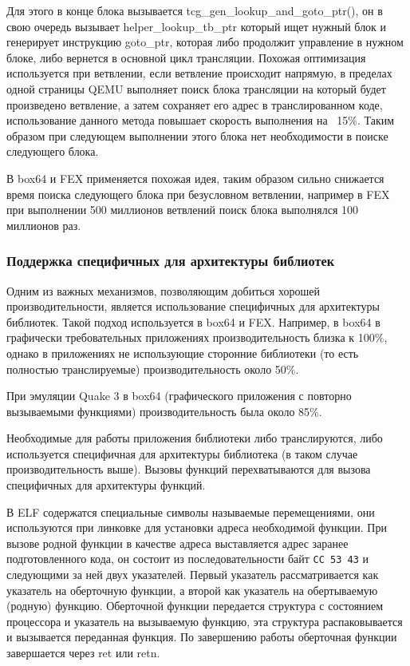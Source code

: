 Для этого в конце блока вызывается tcg\_gen\_lookup\_and\_goto\_ptr(), он в свою очередь вызывает helper\_lookup\_tb\_ptr который ищет нужный блок и генерирует инструкцию goto\_ptr, которая либо продолжит управление в нужном блоке, либо вернется в основной цикл трансляции. Похожая оптимизация используется при ветвлении, если ветвление происходит напрямую, в пределах одной страницы QEMU выполняет поиск блока трансляции на который будет произведено ветвление, а затем сохраняет его адрес в транслированном коде, использование данного метода повышает скорость выполнения на ~15\%. Таким образом при следующем выполнении этого блока нет необходимости в поиске следующего блока. \cite{qemu_docs}

В box64 и FEX применяется похожая идея, таким образом сильно снижается время поиска следующего блока при безусловном ветвлении, например в FEX при выполнении 500 миллионов ветвлений поиск блока выполнялся 100 миллионов раз. \cite{fex_video}

\subsubsection{Поддержка специфичных для архитектуры библиотек}

Одним из важных механизмов, позволяющим добиться хорошей производительности, является использование специфичных для архитектуры библиотек. Такой подход используется в box64 и FEX. Например, в box64 в графически требовательных приложениях производительность близка к 100\%, однако в приложениях не использующие сторонние библиотеки (то есть полностью транслируемые) производительность около 50\%.

При эмуляции Quake 3 в box64 (графического приложения с повторно вызываемыми функциями) производительность была около 85\%.

Необходимые для работы приложения библиотеки либо транслируются, либо используется специфичная для архитектуры библиотека (в таком случае производительность выше). Вызовы функций перехватываются для вызова специфичных для архитектуры функций. 

В ELF содержатся специальные символы называемые перемещениями, они используются при линковке для установки адреса необходимой функции. При вызове родной функции в качестве адреса выставляется адрес заранее подготовленного кода, он состоит из последовательности байт \texttt{CC 53 43} и следующими за ней двух указателей. Первый указатель рассматривается как указатель на оберточную функции, а второй как указатель на обертываемую (родную) функцию. Оберточной функции передается структура с состоянием процессора и указатель на вызываемую функцию, эта структура распаковывается и вызывается переданная функция. По завершению работы оберточная функции завершается через ret или retn.

